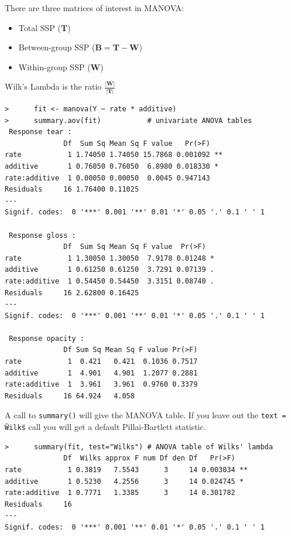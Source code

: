 There are three matrices of interest in MANOVA:

\begin{itemize}
\item Total SSP ($\boldsymbol{T}$)
\item Between-group SSP ($\boldsymbol{B} = \boldsymbol{T} - \boldsymbol{W}$)
\item Within-group SSP ($\boldsymbol{W}$)
\end{itemize}

Wilk's Lambda is the ratio $\frac{|\boldsymbol{W}|}{|\boldsymbol{T}|}$

\singlespacing
\begin{verbatim}
>      fit <- manova(Y ~ rate * additive)
>      summary.aov(fit)           # univariate ANOVA tables
 Response tear :
              Df  Sum Sq Mean Sq F value   Pr(>F)   
rate           1 1.74050 1.74050 15.7868 0.001092 **
additive       1 0.76050 0.76050  6.8980 0.018330 * 
rate:additive  1 0.00050 0.00050  0.0045 0.947143   
Residuals     16 1.76400 0.11025                    
---
Signif. codes:  0 '***' 0.001 '**' 0.01 '*' 0.05 '.' 0.1 ' ' 1 

 Response gloss :
              Df  Sum Sq Mean Sq F value  Pr(>F)  
rate           1 1.30050 1.30050  7.9178 0.01248 *
additive       1 0.61250 0.61250  3.7291 0.07139 .
rate:additive  1 0.54450 0.54450  3.3151 0.08740 .
Residuals     16 2.62800 0.16425                  
---
Signif. codes:  0 '***' 0.001 '**' 0.01 '*' 0.05 '.' 0.1 ' ' 1 

 Response opacity :
              Df Sum Sq Mean Sq F value Pr(>F)
rate           1  0.421   0.421  0.1036 0.7517
additive       1  4.901   4.901  1.2077 0.2881
rate:additive  1  3.961   3.961  0.9760 0.3379
Residuals     16 64.924   4.058               
\end{verbatim}
\onehalfspacing


A call to \texttt{summary()} will give the MANOVA table.   If you leave out the \texttt{text = \"Wilks\"} call you will get a default Pillai-Bartlett statistic.

\singlespacing
\begin{verbatim}
>      summary(fit, test="Wilks") # ANOVA table of Wilks' lambda
              Df  Wilks approx F num Df den Df   Pr(>F)   
rate           1 0.3819   7.5543      3     14 0.003034 **
additive       1 0.5230   4.2556      3     14 0.024745 * 
rate:additive  1 0.7771   1.3385      3     14 0.301782   
Residuals     16                                          
---
Signif. codes:  0 '***' 0.001 '**' 0.01 '*' 0.05 '.' 0.1 ' ' 1 
\end{verbatim}
\onehalfspacing



